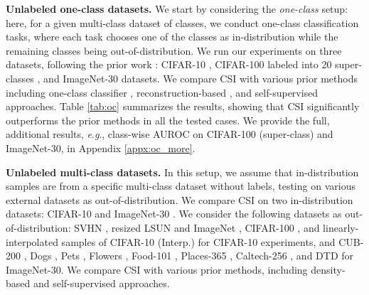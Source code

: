 \documentclass{article}
\newcommand{\eg}{\textit{e}.\textit{g}.}
\begin{document}
\textbf{Unlabeled one-class datasets.}
We start by considering the \emph{one-class} setup: here, for a given multi-class dataset of  classes, we conduct  one-class classification tasks, where each task chooses one of the classes as in-distribution while the remaining classes being out-of-distribution. We run our experiments on three datasets, following the prior work \citep{golan2018deep,hendrycks2019using_self,bergman2020classification}: CIFAR-10 \citep{krizhevsky2009learning}, CIFAR-100 labeled into 20 super-classes \citep{krizhevsky2009learning}, and ImageNet-30 \citep{hendrycks2019using_self} datasets. We compare CSI with various prior methods including one-class classifier \citep{scholkopf2000support,ruff2018deep}, reconstruction-based \citep{schlegl2017unsupervised,perera2019ocgan}, and self-supervised \citep{golan2018deep,hendrycks2019using_self,bergman2020classification} approaches. Table \ref{tab:oc} summarizes the results, showing that CSI significantly outperforms the prior methods in all the tested cases. We provide the full, additional results, \eg, class-wise AUROC on CIFAR-100 (super-class) and ImageNet-30, in Appendix \ref{appx:oc_more}.


\textbf{Unlabeled multi-class datasets.}
In this setup, we assume that in-distribution samples are from a specific multi-class dataset without labels, testing on various external datasets as out-of-distribution. We compare CSI on two in-distribution datasets: CIFAR-10 \citep{krizhevsky2009learning} and ImageNet-30 \citep{hendrycks2019using_self}. We consider the following datasets as out-of-distribution: SVHN \citep{netzer2011reading}, resized LSUN and ImageNet \citep{liang2018enhancing}, CIFAR-100 \citep{krizhevsky2009learning}, and linearly-interpolated samples of CIFAR-10 (Interp.) \citep{du2019implicit} for CIFAR-10 experiments, and CUB-200 \citep{welinder2010caltech}, Dogs \citep{khosla2011novel}, Pets \citep{parkhi2012cats}, Flowers \citep{nilsback2006visual}, Food-101 \citep{bossard2014food}, Places-365 \citep{zhou2017places}, Caltech-256 \citep{griffin2007caltech}, and DTD \citep{cimpoi2014describing} for ImageNet-30. We compare CSI with various prior methods, including density-based \citep{du2019implicit,ren2019likelihood,serra2020input} and self-supervised \citep{golan2018deep,bergman2020classification} approaches. 
\end{document}
